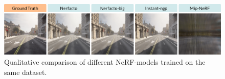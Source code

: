 \begin{figure}[ht]
    \centering
    \includegraphics[width=1.0\textwidth]{figures/different-models.png}
    \caption{Qualitative comparison of different NeRF-models trained on the same dataset.}
    \label{fig:different-models}
\end{figure}